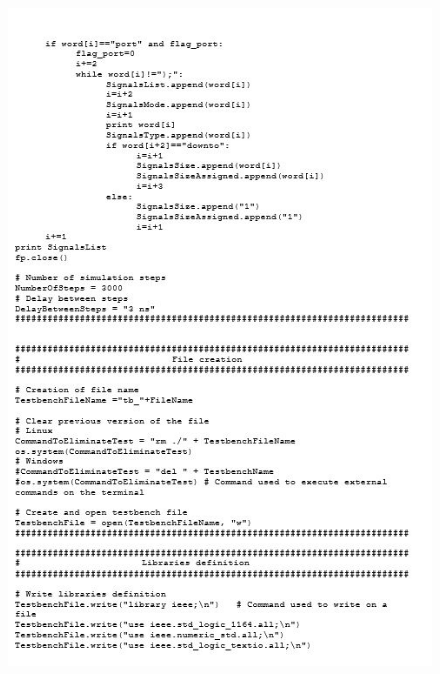 \begin{figure}[!htb]
	\centering
	\includegraphics[scale=1.2]{immagini/tbgen2}
	\label{tbgen2}
\end{figure}
